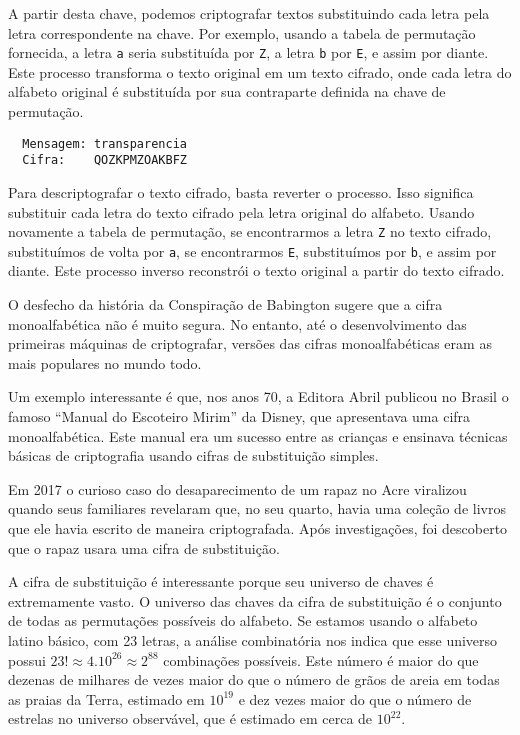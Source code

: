 \begin{example}
A partir desta chave, podemos criptografar textos substituindo cada letra pela letra correspondente na chave.
Por exemplo, usando a tabela de permutação fornecida, a letra {\tt a} seria substituída por {\tt Z}, a letra {\tt b} por {\tt E}, e assim por diante.
Este processo transforma o texto original em um texto cifrado, onde cada letra do alfabeto original é substituída por sua contraparte definida na chave de permutação.

\begin{verbatim}
  Mensagem: transparencia
  Cifra:    QOZKPMZOAKBFZ
\end{verbatim}

Para descriptografar o texto cifrado, basta reverter o processo.
Isso significa substituir cada letra do texto cifrado pela letra original do alfabeto.
Usando novamente a tabela de permutação, se encontrarmos a letra {\tt Z} no texto cifrado, substituímos de volta por {\tt a}, se encontrarmos {\tt E}, substituímos por {\tt b}, e assim por diante.
Este processo inverso reconstrói o texto original a partir do texto cifrado.
\end{example}

O desfecho da história da Conspiração de Babington sugere que a cifra monoalfabética não é muito segura.
No entanto, até o desenvolvimento das primeiras máquinas de criptografar, versões das cifras monoalfabéticas eram as mais populares no mundo todo.

Um exemplo interessante é que, nos anos 70, a Editora Abril publicou no Brasil o famoso ``Manual do Escoteiro Mirim'' da Disney, que apresentava uma cifra monoalfabética.
Este manual era um sucesso entre as crianças e ensinava técnicas básicas de criptografia usando cifras de substituição simples.

Em 2017 o curioso caso do desaparecimento de um rapaz no Acre viralizou quando seus familiares revelaram que, no seu quarto, havia uma coleção de livros que ele havia escrito de maneira criptografada.
Após investigações, foi descoberto que o rapaz usara uma cifra de substituição.

A cifra de substituição é interessante porque seu universo de chaves é extremamente vasto.
O universo das chaves da cifra de substituição é o conjunto de todas as permutações possíveis do alfabeto.
Se estamos usando o alfabeto latino básico, com 23 letras, a análise combinatória nos indica que esse universo possui $23! \approx 4.10^{26} \approx 2^{88}$ combinações possíveis.
Este número é maior do que dezenas de milhares de vezes maior do que o número de grãos de areia em todas as praias da Terra, estimado em $10^{19}$ e dez vezes maior do que o número de estrelas no universo observável, que é estimado em cerca de $10^{22}$.

